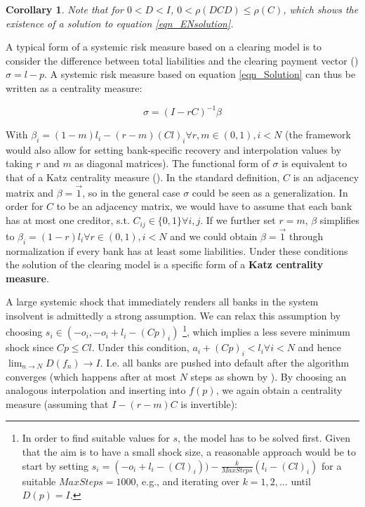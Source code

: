 \documentclass[authoryear,12pt]{elsarticle}
\newtheorem{corollary}{Corollary}
\begin{document}
\begin{corollary} \label{thm_Invertbility_Corollary}
Note that for $0 < D < I$, $0 < \rho (DCD) \le \rho (C)$, which shows the existence of a solution to equation \ref{eqn_ENsolution}.
\end{corollary}

A typical form of a systemic risk measure based on a clearing model is to consider the difference between total liabilities and the clearing payment vector (\cite{Glasserman2016}) $\sigma = l - p$. A systemic risk measure based on equation \ref{eqn_Solution} can thus be written as a centrality measure:

\begin{equation} \label{eqn_Centrality}
\sigma = (I - rC)^{-1}\beta
\end{equation}

With $\beta_i = (1-m)l_i - (r-m)(Cl)_i \forall r,m \in (0,1), i<N$ (the framework would also allow for setting bank-specific recovery and interpolation values by taking $r$ and $m$ as diagonal matrices). The functional form of $\sigma$ is equivalent to that of a Katz centrality measure (\cite{Newman2010, Katz1953}). In the standard definition, $C$ is an adjacency matrix and $\beta = \vec{1}$, so in the general case $\sigma$ could be seen as a generalization. In order for $C$ to be an adjacency matrix, we would have to assume that each bank has at most one creditor, s.t. $C_{ij} \in \{ 0,1 \} \forall i,j$. If we further set $r=m$, $\beta$ simplifies to $\beta_i = (1-r)l_i \forall r\in (0,1), i<N$ and we could obtain $\beta = \vec{1}$ through normalization if every bank has at least some liabilities. Under these conditions the solution of the clearing model is a specific form of a \textbf{Katz centrality measure}.

A large systemic shock that immediately renders all banks in the system insolvent is admittedly a strong assumption. We can relax this assumption by choosing $s_i \in (-o_i,-o_i + l_i - (Cp)_i)$ \footnote{In order to find suitable values for $s$, the model has to be solved first. Given that the aim is to have a small shock size, a reasonable approach would be to start by setting $s_i = (-o_i + l_i - (Cl)_i)) - \frac{k}{MaxSteps} (l_i - (Cl)_i)$ for a suitable $MaxSteps = 1000$, e.g., and iterating over $k = 1, 2, \dots$ until $D(p) = I$.}, which implies a less severe minimum shock since $Cp \le Cl$. Under this condition, $a_i + (Cp)_i < l_i \forall i<N$ and hence $\lim_{n \to N} D(f_n) \to I$. I.e. all banks are pushed into default after the algorithm converges (which happens after at most $N$ steps as shown by \cite{Eisenberg2001}). By choosing an analogous interpolation and inserting into $f(p)$, we again obtain a centrality measure (assuming that $I - (r-m)C$ is invertible):
\end{document}
